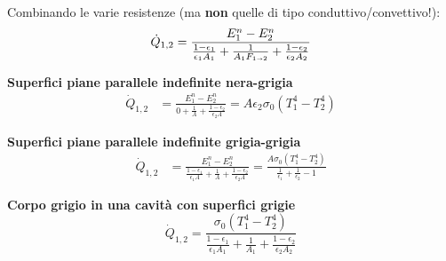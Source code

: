 Combinando le varie resistenze (ma \textbf{non} quelle di tipo conduttivo/convettivo!):
\[
    \dot{Q}_{1,2} = \frac{ E_1^n - E_2^n }{ \frac{1-\epsilon_1}{\epsilon_1A_1} + \frac{1}{A_1F_{1\shortrightarrow 2}} + \frac{1-\epsilon_2}{\epsilon_2A_2} }
\]

\textbf{Superfici piane parallele indefinite nera-grigia}\\
\begin{align*}
    \dot{Q}_{1,2} &= \frac{ E_1^n - E_2^n }{ 0 + \frac{1}{A} + \frac{1-\epsilon_2}{\epsilon_2A} } = A\epsilon_2\sigma_0(T_1^4 - T_2^4)
\end{align*}

\textbf{Superfici piane parallele indefinite grigia-grigia}\\
\begin{align*}
    \dot{Q}_{1,2} &= \frac{ E_1^n - E_2^n }{ \frac{1-\epsilon_1}{\epsilon_1A} + \frac{1}{A} + \frac{1-\epsilon_2}{\epsilon_2A} } =
    \frac{A\sigma_0(T_1^4 - T_2^4)}{ \frac{1}{\epsilon_1} + \frac{1}{\epsilon_2} - 1 }
\end{align*}

\textbf{Corpo grigio in una cavità con superfici grigie}\\
\[
    \dot{Q}_{1,2} = \frac{ \sigma_0(T_1^4 - T_2^4) }{ \frac{1-\epsilon_1}{\epsilon_1A_1} + \frac{1}{A_1} + \frac{1-\epsilon_2}{\epsilon_2A_2} }
\]
